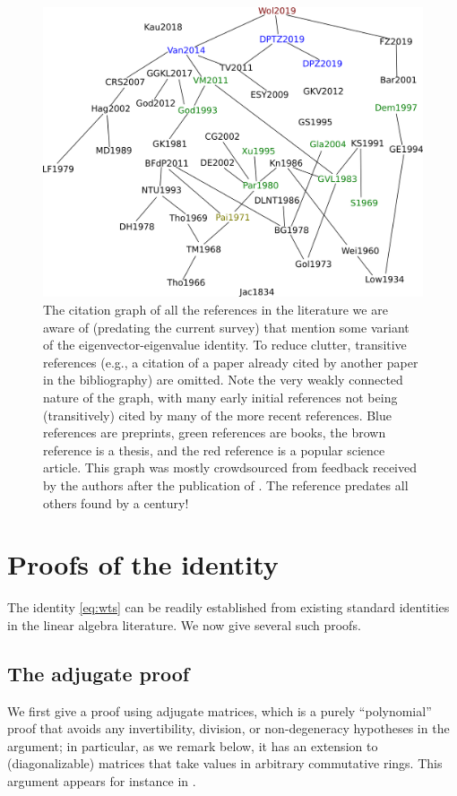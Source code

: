 \documentclass[12pt]{amsart}
\begin{document}
\begin{figure} [t]
\centering
\includegraphics[width=4.5in]{./citation.png}
\caption{The citation graph of all the references in the literature we are aware of (predating the current survey) that mention some variant of the eigenvector-eigenvalue identity.  To reduce clutter, transitive references (e.g., a citation of a paper already cited by another paper in the bibliography) are omitted.  Note the very weakly connected nature of the graph, with many early initial references not being (transitively) cited by many of the more recent references.  Blue references are preprints, green references are books, the brown reference is a thesis, and the red reference is a popular science article.  This graph was mostly crowdsourced from feedback received by the authors after the publication of \cite{wolchover-2019}.  The reference \cite{jacobi} predates all others found by a century!}
\label{fig:graph}
\end{figure}


\section{Proofs of the identity}

The identity \eqref{eq:wts} can be readily established from existing standard identities in the linear algebra literature.  We now give several such proofs.

\subsection{The adjugate proof}\label{adjugate-sec}

We first give a proof using adjugate matrices, which is a purely ``polynomial'' proof that avoids any invertibility, division, or non-degeneracy hypotheses in the argument; in particular, as we remark below, it has an extension to (diagonalizable) matrices that take values in arbitrary commutative rings.  This argument appears for instance in \cite[Section 7.9]{Parlett}.
\end{document}
